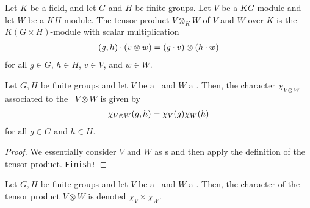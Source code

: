 \begin{boxdefinition}
    Let $K$ be a field, and let $G$ and $H$ be finite groups. Let $V$ be a $KG$-module and let $W$ be a $KH$-module. The tensor product $V \otimes_K W$ of $V$ and $W$ over $K$ is the $K(G \times H)$-module with scalar multiplication
    \begin{align}
        \left( g, h \right) \cdot \left( v \otimes w \right) = \left( g \cdot v \right) \otimes \left( h \cdot w \right)
    \end{align}
    for all $g \in G$, $h \in H$, $v \in V$, and $w \in W$.
\end{boxdefinition}

\begin{proposition}
    Let $G, H$ be finite groups and let $V$ be a \CGM\ and $W$ a \CHM. Then, the character $\chi_{V \otimes W}$ associated to the \CGHM\ $V \otimes W$ is given by
    \begin{align*}
        \chi_{V \otimes W}\!\left( g, h \right) = \chi_V(g) \chi_W(h)
    \end{align*}
    for all $g \in G$ and $h \in H$.
\end{proposition}
\begin{proof}
    We essentially consider $V$ and $W$ as \CGHM s and then apply the definition of the tensor product. \verb|Finish!|
\end{proof}

\begin{boxnotation}
    Let $G, H$ be finite groups and let $V$ be a \CGM\ and $W$ a \CHM. Then, the character of the tensor product $V \otimes W$ is denoted $\chi_V \times \chi_W$.
\end{boxnotation}

